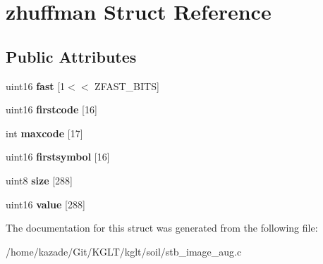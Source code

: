 \hypertarget{structzhuffman}{\section{zhuffman Struct Reference}
\label{structzhuffman}
}
\subsection*{Public Attributes}
\begin{DoxyCompactItemize}
\item 
\hypertarget{structzhuffman_a12d5f92a121b65680e5f0b4027d00c96}{uint16 {\bfseries fast} \mbox{[}1$<$$<$ Z\-F\-A\-S\-T\-\_\-\-B\-I\-T\-S\mbox{]}}\label{structzhuffman_a12d5f92a121b65680e5f0b4027d00c96}

\item 
\hypertarget{structzhuffman_a81f5ae5bd31b40439955de6154572917}{uint16 {\bfseries firstcode} \mbox{[}16\mbox{]}}\label{structzhuffman_a81f5ae5bd31b40439955de6154572917}

\item 
\hypertarget{structzhuffman_ac7dd4a2bf01a6e27933dd1cf6b0cc762}{int {\bfseries maxcode} \mbox{[}17\mbox{]}}\label{structzhuffman_ac7dd4a2bf01a6e27933dd1cf6b0cc762}

\item 
\hypertarget{structzhuffman_afbdb21fd99f413fc8f9e58243552fe95}{uint16 {\bfseries firstsymbol} \mbox{[}16\mbox{]}}\label{structzhuffman_afbdb21fd99f413fc8f9e58243552fe95}

\item 
\hypertarget{structzhuffman_a46ce4d4a4d7fc41c2560616f6696e9b9}{uint8 {\bfseries size} \mbox{[}288\mbox{]}}\label{structzhuffman_a46ce4d4a4d7fc41c2560616f6696e9b9}

\item 
\hypertarget{structzhuffman_acc395b638b700b944c329d71a8b82084}{uint16 {\bfseries value} \mbox{[}288\mbox{]}}\label{structzhuffman_acc395b638b700b944c329d71a8b82084}

\end{DoxyCompactItemize}


The documentation for this struct was generated from the following file\-:\begin{DoxyCompactItemize}
\item 
/home/kazade/\-Git/\-K\-G\-L\-T/kglt/soil/stb\-\_\-image\-\_\-aug.\-c\end{DoxyCompactItemize}
